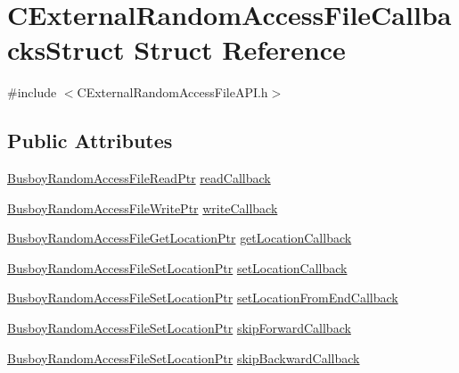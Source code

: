 \hypertarget{structCExternalRandomAccessFileCallbacksStruct}{
\section{CExternalRandomAccessFileCallbacksStruct Struct Reference}
\label{structCExternalRandomAccessFileCallbacksStruct}
}


{\ttfamily \#include $<$CExternalRandomAccessFileAPI.h$>$}\subsection*{Public Attributes}
\begin{DoxyCompactItemize}
\item 
\hyperlink{CExternalRandomAccessFileAPI_8h_aba79ae60c4ff5e8b9e923040f1cd613a}{BusboyRandomAccessFileReadPtr} \hyperlink{structCExternalRandomAccessFileCallbacksStruct_ad7eac16e7bd234e2f86f24679105d4de}{readCallback}
\item 
\hyperlink{CExternalRandomAccessFileAPI_8h_aa72f560af87f9b6267949e25aef0448f}{BusboyRandomAccessFileWritePtr} \hyperlink{structCExternalRandomAccessFileCallbacksStruct_a20ee542cc0be107eee78495aa99a447b}{writeCallback}
\item 
\hyperlink{CExternalRandomAccessFileAPI_8h_ab24a3bee396e3f581b9b28a0f6727c6e}{BusboyRandomAccessFileGetLocationPtr} \hyperlink{structCExternalRandomAccessFileCallbacksStruct_ad54e39da39d5ed25b1f4cefce6b6f649}{getLocationCallback}
\item 
\hyperlink{CExternalRandomAccessFileAPI_8h_a71a1636fe9f87be2c70c9e2196b050b9}{BusboyRandomAccessFileSetLocationPtr} \hyperlink{structCExternalRandomAccessFileCallbacksStruct_ae08f6c355c2ecef796ebfcf8692c59d4}{setLocationCallback}
\item 
\hyperlink{CExternalRandomAccessFileAPI_8h_a71a1636fe9f87be2c70c9e2196b050b9}{BusboyRandomAccessFileSetLocationPtr} \hyperlink{structCExternalRandomAccessFileCallbacksStruct_adc6aa934d3e1f9f6c7d78a9c89acb45d}{setLocationFromEndCallback}
\item 
\hyperlink{CExternalRandomAccessFileAPI_8h_a71a1636fe9f87be2c70c9e2196b050b9}{BusboyRandomAccessFileSetLocationPtr} \hyperlink{structCExternalRandomAccessFileCallbacksStruct_ac83e2a66e6c23140aef457767a5f1712}{skipForwardCallback}
\item 
\hyperlink{CExternalRandomAccessFileAPI_8h_a71a1636fe9f87be2c70c9e2196b050b9}{BusboyRandomAccessFileSetLocationPtr} \hyperlink{structCExternalRandomAccessFileCallbacksStruct_a239c3885e5d6e8a3eab0c6fd9ac488ce}{skipBackwardCallback}

\end{DoxyCompactItemize}
